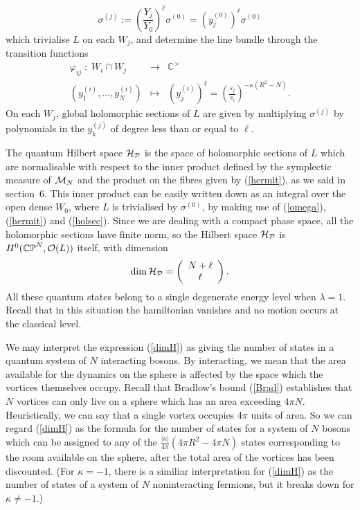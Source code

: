 \documentclass[a4paper,11pt]{article}
\begin{document}
\[
\sigma^{(j)}:=\left(\frac{Y_{j}}{Y_{0}}\right)^{\ell}\sigma^{(0)}=
\left( y_{j}^{(0)}  \right)^{\ell}\sigma^{(0)}
\]
which trivialise $L$ on each $W_{j}$, and determine the line bundle
through the transition functions
\begin{eqnarray*}
\varphi_{ij}\;:\;W_{i}\cap W_{j}&\longrightarrow &\mathbb{C}^{\times}\\
(y^{(i)}_{1},\ldots,y^{(i)}_{N})&\longmapsto&
\left(y_{j}^{(i)}\right)^{\ell}=
\left(\frac{s_{j}}{s_{i}}\right)^{-\kappa(R^{2}-N)}.
\end{eqnarray*}
On each $W_{j}$, global holomorphic sections of $L$ are given by multiplying
$\sigma^{(j)}$ by polynomials in the $y^{(j)}_{k}$ of degree
less than or equal to $\ell$.


The quantum Hilbert space ${\cal H}_{\cal P}$ is the space
of holomorphic sections of $L$ which are normalisable with respect to
the inner product defined by the symplectic measure of 
${\cal M}_{N}$ and the product on the fibres given by (\ref{hermit}),
as we said in section~6.
This inner product can be easily written down as an integral over the open
dense $W_{0}$, where $L$ is trivialised by $\sigma^{(0)}$, by 
making use of (\ref{omega}), (\ref{hermit}) and (\ref{holsec}).
Since we are dealing with a compact phase space, all the holomorphic 
sections have finite norm, so the Hilbert space ${\cal H}_{\cal P}$ is 
$H^{0}(\mathbb{CP}^{N}, {\cal O}(L))$ itself, with dimension
\begin{equation} \label{dimH}
\dim {\cal H}_{\cal P} = 
\left(
\begin{array}{c}
{N+\ell} \\
{\ell}
\end{array}
\right).
\end{equation}
All these quantum states belong to a single degenerate energy
level when $\lambda=1$. Recall that in this situation the hamiltonian 
vanishes and no motion occurs at the classical level.



We may interpret the expression (\ref{dimH}) as giving the number of 
states in a
quantum system of $N$ interacting bosons. By interacting, we mean that
the area available for the dynamics on the sphere is affected by
the space which the vortices themselves occupy. Recall that 
Bradlow's bound (\ref{Brad}) establishes that $N$ vortices
can only live on a sphere which has an area exceeding $4\pi
N$. Heuristically, we can say that a single vortex occupies $4\pi$
units of area. So we can regard (\ref{dimH}) as the formula for the
number of states for a system of $N$
bosons which can be assigned to any of the 
$\frac{|\kappa|}{4\pi}( 4\pi R^{2}- 4\pi N)$ states
corresponding to the room available on the sphere, after the total area
of the vortices has been discounted. (For $\kappa=-1$, there is a
similiar interpretation for (\ref{dimH}) as the number of states
of a system of $N$ noninteracting fermions, but it breaks down for 
$\kappa\ne -1$.)
\end{document}
